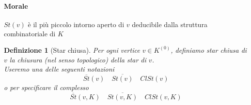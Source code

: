 \documentclass[a4paper]{report}
\newtheorem{definition}{Definizione}
\begin{document}
\paragraph{Morale} $St(v)$ è il più piccolo intorno aperto di $v$ deducibile dalla struttura combinatoriale di $K$
\begin{definition}[Star chiusa]
    Per ogni vertice $v\in K^{(0)}$, definiamo star chiusa di $v$ la chiusura (nel senso topologico) della star di $v$.\\
    Useremo una delle seguenti notazioni
    \[
        \overline{St}(v)\quad \overline{St(v)}\quad ClSt(v)
    \]
    o per specificare il complesso
    \[
        \overline{St}(v,K)\quad \overline{St(v,K)}\quad ClSt(v,K)
    \]
\end{definition}
\begin{center}



    \begin{tikzpicture}[x=0.75pt,y=0.75pt,yscale=-1,xscale=1]


\end{tikzpicture}
\end{center}
\end{document}
